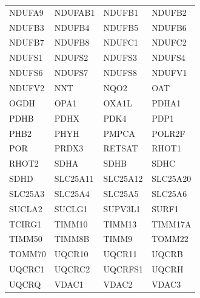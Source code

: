 \begin{longtable}{llll}
NDUFA9 & NDUFAB1 & NDUFB1 & NDUFB2 \\
NDUFB3 & NDUFB4 & NDUFB5 & NDUFB6 \\
NDUFB7 & NDUFB8 & NDUFC1 & NDUFC2 \\
NDUFS1 & NDUFS2 & NDUFS3 & NDUFS4 \\
NDUFS6 & NDUFS7 & NDUFS8 & NDUFV1 \\
NDUFV2 & NNT & NQO2 & OAT \\
OGDH & OPA1 & OXA1L & PDHA1 \\
PDHB & PDHX & PDK4 & PDP1 \\
PHB2 & PHYH & PMPCA & POLR2F \\
POR & PRDX3 & RETSAT & RHOT1 \\
RHOT2 & SDHA & SDHB & SDHC \\
SDHD & SLC25A11 & SLC25A12 & SLC25A20 \\
SLC25A3 & SLC25A4 & SLC25A5 & SLC25A6 \\
SUCLA2 & SUCLG1 & SUPV3L1 & SURF1 \\
TCIRG1 & TIMM10 & TIMM13 & TIMM17A \\
TIMM50 & TIMM8B & TIMM9 & TOMM22 \\
TOMM70 & UQCR10 & UQCR11 & UQCRB \\
UQCRC1 & UQCRC2 & UQCRFS1 & UQCRH \\
UQCRQ & VDAC1 & VDAC2 & VDAC3 \\
\end{longtable}

